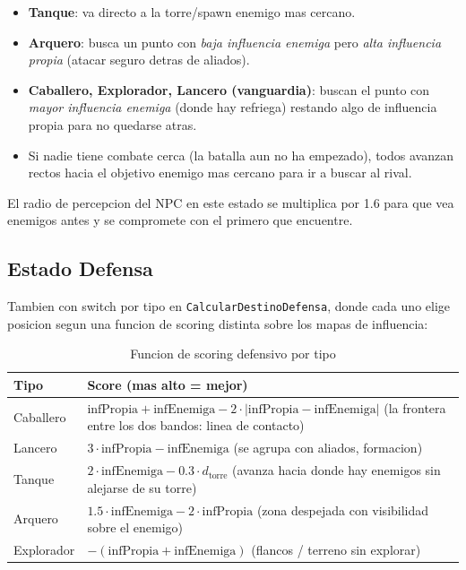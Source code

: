 \documentclass[12pt,a4paper]{article}
\begin{document}
\begin{itemize}[leftmargin=1.5em]
    \item \textbf{Tanque}: va directo a la torre/spawn enemigo mas cercano.
    \item \textbf{Arquero}: busca un punto con \emph{baja influencia enemiga} pero \emph{alta influencia propia} (atacar seguro detras de aliados).
    \item \textbf{Caballero, Explorador, Lancero (vanguardia)}: buscan el punto con \emph{mayor influencia enemiga} (donde hay refriega) restando algo de influencia propia para no quedarse atras.
    \item Si nadie tiene combate cerca (la batalla aun no ha empezado), todos avanzan rectos hacia el objetivo enemigo mas cercano para ir a buscar al rival.
\end{itemize}

El radio de percepcion del NPC en este estado se multiplica por 1.6
para que vea enemigos antes y se compromete con el primero que encuentre.

\subsection{Estado Defensa}

Tambien con switch por tipo en \texttt{CalcularDestinoDefensa}, donde
cada uno elige posicion segun una funcion de scoring distinta sobre
los mapas de influencia:

\begin{table}[H]
\centering
\caption{Funcion de scoring defensivo por tipo}
\label{tab:scoringdef}
\renewcommand{\arraystretch}{1.2}
\begin{tabularx}{\textwidth}{l X}
\toprule
\textbf{Tipo} & \textbf{Score (mas alto = mejor)} \\
\midrule
Caballero  & $\text{infPropia} + \text{infEnemiga} - 2 \cdot |\text{infPropia} - \text{infEnemiga}|$  (la frontera entre los dos bandos: linea de contacto) \\
Lancero    & $3 \cdot \text{infPropia} - \text{infEnemiga}$ (se agrupa con aliados, formacion) \\
Tanque     & $2 \cdot \text{infEnemiga} - 0.3 \cdot d_{\text{torre}}$ (avanza hacia donde hay enemigos sin alejarse de su torre) \\
Arquero    & $1.5 \cdot \text{infEnemiga} - 2 \cdot \text{infPropia}$ (zona despejada con visibilidad sobre el enemigo) \\
Explorador & $-(\text{infPropia} + \text{infEnemiga})$ (flancos / terreno sin explorar) \\
\bottomrule
\end{tabularx}
\end{table}
\end{document}
